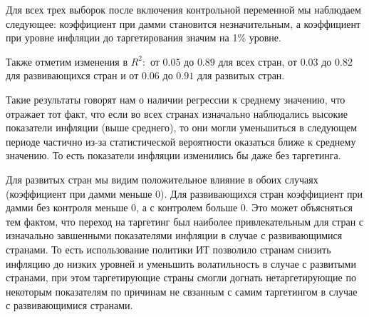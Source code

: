 \documentclass[a4paper,12pt]{article} %
\begin{document}
Для всех трех выборок после включения контрольной переменной мы наблюдаем следующее: 
коэффициент при дамми становится незначительным, а коэффициент при уровне инфляции до таргетирования значим на 1\% уровне. 


Также отметим изменения в $ R^2:  $ 
от $ 0.05 $  до $ 0.89 $ для всех стран, от $ 0.03 $ до $ 0.82 $ для развивающихся стран и от $ 0.06 $ до $ 0.91 $ для развитых стран. 


Такие результаты говорят нам о наличии регрессии к среднему значению, что  отражает тот факт, что если во всех странах  изначально наблюдались высокие показатели инфляции (выше среднего), то они  
могли уменьшиться в следующем периоде частично из-за статистической вероятности оказаться ближе к среднему значению. То есть показатели инфляции изменились бы даже без таргетинга. 



Для развитых стран мы видим положительное влияние в обоих случаях (коэффициент при дамми меньше 0). 
Для развивающихся стран коэффициент при дамми без контроля меньше 0, а с контролем больше 0. 
Это может объясняться тем фактом, что
переход на таргетинг был наиболее привлекательным для стран с изначально завшенными показателями инфляции в случае с развивающимися странами. 
То есть  использование политики ИТ 
позволило странам снизить инфляцию до низких уровней и уменьшить волатильность в случае с развитыми странами, при 
этом таргетирующие страны смогли догнать 
нетаргетирующие по некоторым показателям по причинам не  свзанным с самим  таргетингом в случае с развивающимися странами.
\end{document}
